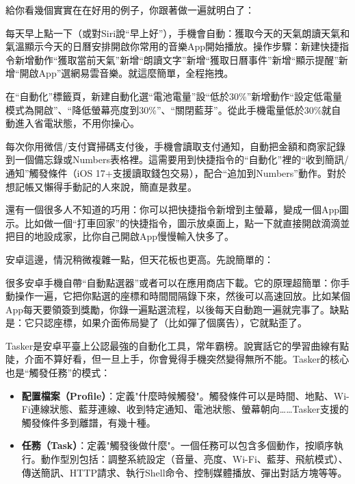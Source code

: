給你看幾個實實在在好用的例子，你跟著做一遍就明白了：


每天早上點一下（或對Siri說“早上好”），手機會自動：獲取今天的天氣朗讀天氣和氣溫顯示今天的日曆安排開啟你常用的音樂App開始播放。操作步驟：新建快捷指令新增動作“獲取當前天氣”新增“朗讀文字”新增“獲取日曆事件”新增“顯示提醒”新增“開啟App”選網易雲音樂。就這麼簡單，全程拖拽。


在“自動化”標籤頁，新建自動化選“電池電量”設“低於30\%”新增動作“設定低電量模式為開啟”、“降低螢幕亮度到30\%”、“關閉藍芽”。從此手機電量低於30\%就自動進入省電狀態，不用你操心。


每次你用微信/支付寶掃碼支付後，手機會讀取支付通知，自動把金額和商家記錄到一個備忘錄或Numbers表格裡。這需要用到快捷指令的“自動化”裡的“收到簡訊/通知”觸發條件（iOS 17+支援讀取錢包交易），配合“追加到Numbers”動作。對於想記帳又懶得手動記的人來說，簡直是救星。

還有一個很多人不知道的巧用：你可以把快捷指令新增到主螢幕，變成一個App圖示。比如做一個“打車回家”的快捷指令，圖示放桌面上，點一下就直接開啟滴滴並把目的地設成家，比你自己開啟App慢慢輸入快多了。


安卓這邊，情況稍微複雜一點，但天花板也更高。先說簡單的：


很多安卓手機自帶“自動點選器”或者可以在應用商店下載。它的原理超簡單：你手動操作一遍，它把你點選的座標和時間間隔錄下來，然後可以高速回放。比如某個App每天要領簽到獎勵，你錄一遍點選流程，以後每天自動跑一遍就完事了。缺點是：它只認座標，如果介面佈局變了（比如彈了個廣告），它就點歪了。


Tasker是安卓平臺上公認最強的自動化工具，常年霸榜。說實話它的學習曲線有點陡，介面不算好看，但一旦上手，你會覺得手機突然變得無所不能。Tasker的核心也是“觸發任務”的模式：

\begin{itemize}
  \item \textbf{配置檔案（Profile）}：定義"什麼時候觸發"。觸發條件可以是時間、地點、Wi-Fi連線狀態、藍芽連線、收到特定通知、電池狀態、螢幕朝向……Tasker支援的觸發條件多到離譜，有幾十種。
  \item \textbf{任務（Task）}：定義"觸發後做什麼"。一個任務可以包含多個動作，按順序執行。動作型別包括：調整系統設定（音量、亮度、Wi-Fi、藍芽、飛航模式）、傳送簡訊、HTTP請求、執行Shell命令、控制媒體播放、彈出對話方塊等等。
\end{itemize}

